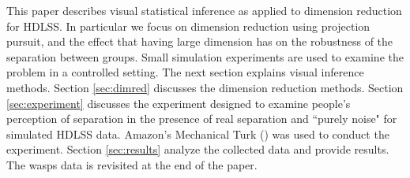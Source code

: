





This paper describes visual statistical inference as applied to dimension reduction for HDLSS. In particular we focus on dimension reduction using projection pursuit, and the effect that having large dimension has on the robustness of the separation between groups.  Small simulation experiments are used to examine the problem in a controlled setting. The next section explains visual inference methods. Section \ref{sec:dimred} discusses the dimension reduction methods. Section \ref{sec:experiment} discusses the experiment designed to examine people's perception of separation in the presence of real separation and ``purely noise" for simulated HDLSS data. %
 Amazon's Mechanical Turk (\cite{turk}) was used to conduct the experiment. Section \ref{sec:results} analyze the collected data and provide results. The wasps data is revisited at the end of the paper. 


